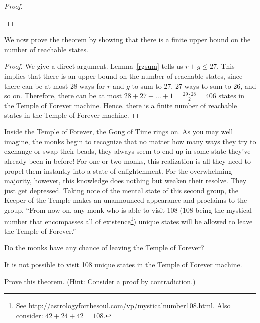 \documentclass[12pt]{article}
\begin{document}
{\begin{proof}
\begin{enumerate}
\end{enumerate}
\end{proof}

We now prove the theorem by showing that there is a finite upper bound
on the number of reachable states.

\begin{proof}
  We give a direct argument. Lemma~\ref{rgsum} tells us $r+g\leq 27$.
  This implies that there is an upper bound on the number of reachable
  states, since there can be at most 28 ways for $r$ and $g$ to sum to
  27, 27 ways to sum to 26, and so on.  Therefore, there can be at
  most $28+27+\ldots+1=\frac{29\cdot 28}{2}=406$ states in the Temple
  of Forever machine. Hence, there is a finite number of reachable
  states in the Temple of Forever machine.
\end{proof}

} %

Inside the Temple of Forever, the Gong of Time rings on. As you may
well imagine, the monks begin to recognize that no matter how many
ways they try to exchange or swap their beads, they always seem to end
up in some state they've already been in before! For one or two monks,
this realization is all they need to propel them instantly into a
state of enlightenment. For the overwhelming majority, however, this
knowledge does nothing but weaken their resolve. They just get
depressed. Taking note of the mental state of this second group, the
Keeper of the Temple makes an unannounced appearance and proclaims to
the group, ``From now on, any monk who is able to visit 108 (108 being
the mystical number that encompasses all of existence\footnote{See
  http://astrologyforthesoul.com/vp/mysticalnumber108.html. Also
  consider: $42+24+42=108$.})  unique states will be allowed to leave
the Temple of Forever.''

Do the monks have any chance of leaving the Temple of Forever?

\begin{theorem}
  It is not possible to visit 108 unique states in the Temple of
  Forever machine.
\end{theorem}

Prove this theorem. (Hint: Consider a proof by contradiction.)
\end{document}
